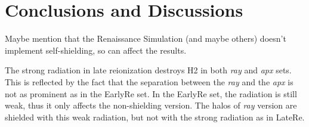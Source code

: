 \documentclass[linenumbers, twocolumn]{aastex631}
\begin{document}


\section{Conclusions and Discussions}
Maybe mention that the Renaissance Simulation (and maybe others) doesn't implement self-shielding, so can affect the results.

The strong radiation in late reionization destroys H2 in both \textit{ray} and \textit{apx} sets. This is reflected by the fact that the separation between the \textit{ray} and the \textit{apx} is not as prominent as in the EarlyRe set. In the EarlyRe set, the radiation is still weak, thus it only affects the non-shielding version. The halos of \textit{ray} version are shielded with this weak radiation, but not with the strong radiation as in LateRe.  
\end{document}
